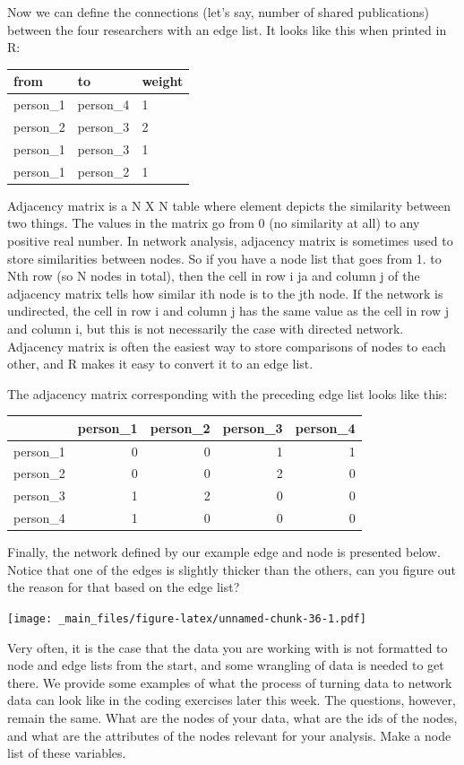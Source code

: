 \documentclass[
]{book}
\begin{document}
Now we can define the connections (let's say, number of shared publications) between the four researchers with an edge list. It looks like this when printed in R:

\begin{tabular}{l|l|l}
\hline
from & to & weight\\
\hline
person\_1 & person\_4 & 1\\
\hline
person\_2 & person\_3 & 2\\
\hline
person\_1 & person\_3 & 1\\
\hline
person\_1 & person\_2 & 1\\
\hline
\end{tabular}

Adjacency matrix is a N X N table where element depicts the similarity between two things. The values in the matrix go from 0 (no similarity at all) to any positive real number. In network analysis, adjacency matrix is sometimes used to store similarities between nodes. So if you have a node list that goes from 1. to Nth row (so N nodes in total), then the cell in row i ja and column j of the adjacency matrix tells how similar ith node is to the jth node. If the network is undirected, the cell in row i and column j has the same value as the cell in row j and column i, but this is not necessarily the case with directed network. Adjacency matrix is often the easiest way to store comparisons of nodes to each other, and R makes it easy to convert it to an edge list.

The adjacency matrix corresponding with the preceding edge list looks like this:

\begin{tabular}{l|r|r|r|r}
\hline
  & person\_1 & person\_2 & person\_3 & person\_4\\
\hline
person\_1 & 0 & 0 & 1 & 1\\
\hline
person\_2 & 0 & 0 & 2 & 0\\
\hline
person\_3 & 1 & 2 & 0 & 0\\
\hline
person\_4 & 1 & 0 & 0 & 0\\
\hline
\end{tabular}

Finally, the network defined by our example edge and node is presented below. Notice that one of the
edges is slightly thicker than the others, can you figure out the reason for that based on the edge list?

\texttt{[image: \_main\_files/figure-latex/unnamed-chunk-36-1.pdf]}

Very often, it is the case that the data you are working with is not formatted to node and edge lists from the start, and some wrangling of data is needed to get there. We provide some examples of what the process of turning data to network data can look like in the coding exercises later this week. The questions, however, remain the same. What are the nodes of your data, what are the ids of the nodes, and what are the attributes of the nodes relevant for your analysis. Make a node list of these variables.
\end{document}

